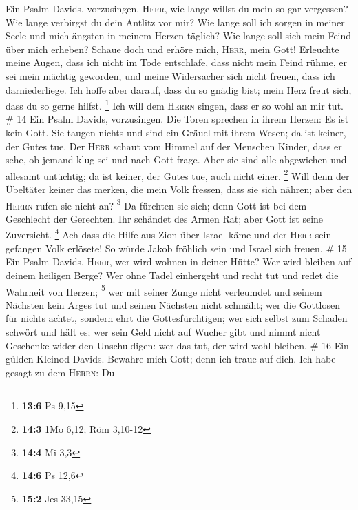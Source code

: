  Ein Psalm Davids, vorzusingen. 
\textsc{Herr}, wie lange willst du mein so gar vergessen? Wie lange
verbirgst du dein Antlitz vor mir?  Wie lange soll ich
sorgen in meiner Seele und mich ängsten in meinem Herzen täglich? Wie
lange soll sich mein Feind über mich erheben?  Schaue doch
und erhöre mich, \textsc{Herr}, mein Gott! Erleuchte meine Augen, dass
ich nicht im Tode entschlafe,  dass nicht mein Feind
rühme, er sei mein mächtig geworden, und meine Widersacher sich nicht
freuen, dass ich darniederliege.  Ich hoffe aber darauf,
dass du so gnädig bist; mein Herz freut sich, dass du so gerne hilfst.
\footnote{\textbf{13:6} Ps 9,15}  Ich will dem
\textsc{Herrn} singen, dass er so wohl an mir tut. \# 14 
Ein Psalm Davids, vorzusingen. Die Toren sprechen in ihrem Herzen: Es
ist kein Gott. Sie taugen nichts und sind ein Gräuel mit ihrem Wesen; da
ist keiner, der Gutes tue.  Der \textsc{Herr} schaut vom
Himmel auf der Menschen Kinder, dass er sehe, ob jemand klug sei und
nach Gott frage.  Aber sie sind alle abgewichen und
allesamt untüchtig; da ist keiner, der Gutes tue, auch nicht einer.
\footnote{\textbf{14:3} 1Mo 6,12; Röm 3,10-12}  Will denn
der Übeltäter keiner das merken, die mein Volk fressen, dass sie sich
nähren; aber den \textsc{Herrn} rufen sie nicht an? \footnote{\textbf{14:4}
  Mi 3,3}  Da fürchten sie sich; denn Gott ist bei dem
Geschlecht der Gerechten.  Ihr schändet des Armen Rat;
aber Gott ist seine Zuversicht. \footnote{\textbf{14:6} Ps 12,6}
 Ach dass die Hilfe aus Zion über Israel käme und der
\textsc{Herr} sein gefangen Volk erlösete! So würde Jakob fröhlich sein
und Israel sich freuen. \# 15  Ein Psalm Davids.
\textsc{Herr}, wer wird wohnen in deiner Hütte? Wer wird bleiben auf
deinem heiligen Berge?  Wer ohne Tadel einhergeht und
recht tut und redet die Wahrheit von Herzen; \footnote{\textbf{15:2} Jes
  33,15}  wer mit seiner Zunge nicht verleumdet und seinem
Nächsten kein Arges tut und seinen Nächsten nicht schmäht;
 wer die Gottlosen für nichts achtet, sondern ehrt die
Gottesfürchtigen; wer sich selbst zum Schaden schwört und hält es;
 wer sein Geld nicht auf Wucher gibt und nimmt nicht
Geschenke wider den Unschuldigen: wer das tut, der wird wohl bleiben. \#
16  Ein gülden Kleinod Davids. Bewahre mich Gott; denn ich
traue auf dich.  Ich habe gesagt zu dem \textsc{Herrn}: Du
